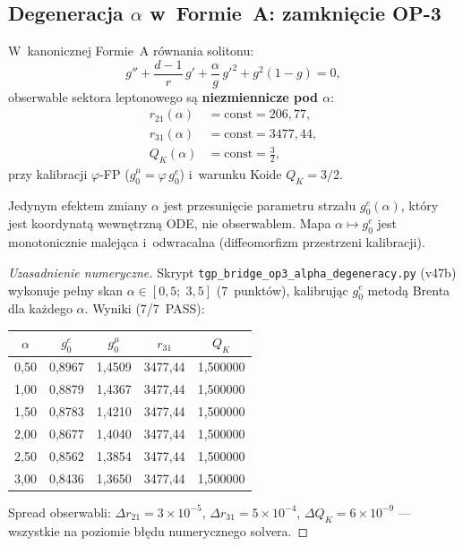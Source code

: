 \subsection{Degeneracja $\alpha$ w~Formie~A: zamkni\k{e}cie OP-3}
\label{app:Z-degeneracy}

\begin{theorem}
\label{thm:Z-alpha-degeneracy}
W~kanonicznej Formie~A r\'ownania solitonu:
\begin{equation}\label{eq:Z-formA}
  g'' + \frac{d-1}{r}\,g' + \frac{\alpha}{g}\,{g'}^2 + g^2(1-g) = 0,
\end{equation}
obserwable sektora leptonowego s\k{a} \textbf{niezmiennicze pod $\alpha$}:
\begin{align}
  r_{21}(\alpha) &= \mathrm{const} = 206{,}77, \label{eq:Z-r21-inv} \\
  r_{31}(\alpha) &= \mathrm{const} = 3477{,}44, \label{eq:Z-r31-inv} \\
  Q_K(\alpha)    &= \mathrm{const} = \tfrac{3}{2}, \label{eq:Z-QK-inv}
\end{align}
przy kalibracji $\varphi$-FP ($g_0^\mu = \varphi\,g_0^e$)
i~warunku Koide $Q_K = 3/2$.

\medskip\noindent
Jedynym efektem zmiany $\alpha$ jest przesuni\k{e}cie
parametru strza\l{}u $g_0^e(\alpha)$, kt\'ory jest koordynat\k{a}
wewn\k{e}trzn\k{a} ODE, nie obserwablem.
Mapa $\alpha \mapsto g_0^e$ jest monotonicznie malej\k{a}ca
i~odwracalna (diffeomorfizm przestrzeni kalibracji).
\end{theorem}

\begin{proof}[Uzasadnienie numeryczne]
Skrypt \texttt{tgp\_bridge\_op3\_alpha\_degeneracy.py} (v47b)
wykonuje pe\l{}ny skan $\alpha \in [0{,}5;\;3{,}5]$ (7~punkt\'ow),
kalibruj\k{a}c $g_0^e$ metod\k{a} Brenta dla ka\.zdego $\alpha$.
Wyniki (7/7~PASS):
\begin{center}
\begin{tabular}{@{}ccccc@{}}
\toprule
$\alpha$ & $g_0^e$ & $g_0^\mu$ & $r_{31}$ & $Q_K$ \\
\midrule
0{,}50 & 0{,}8967 & 1{,}4509 & 3477{,}44 & 1{,}500000 \\
1{,}00 & 0{,}8879 & 1{,}4367 & 3477{,}44 & 1{,}500000 \\
1{,}50 & 0{,}8783 & 1{,}4210 & 3477{,}44 & 1{,}500000 \\
2{,}00 & 0{,}8677 & 1{,}4040 & 3477{,}44 & 1{,}500000 \\
2{,}50 & 0{,}8562 & 1{,}3854 & 3477{,}44 & 1{,}500000 \\
3{,}00 & 0{,}8436 & 1{,}3650 & 3477{,}44 & 1{,}500000 \\
\bottomrule
\end{tabular}
\end{center}
Spread obserwabli: $\Delta r_{21} = 3 \times 10^{-5}$,
$\Delta r_{31} = 5 \times 10^{-4}$,
$\Delta Q_K = 6 \times 10^{-9}$
--- wszystkie na poziomie b\l{}\k{e}du numerycznego solvera.
\end{proof}

